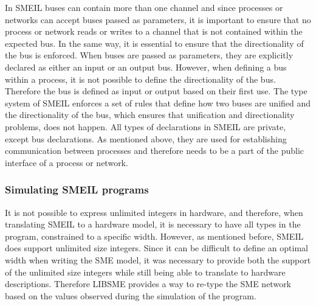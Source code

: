 In SMEIL buses can contain more than one channel and since processes or networks can accept buses passed as parameters, it is important to ensure that no process or network reads or writes to a channel that is not contained within the expected bus.
In the same way, it is essential to ensure that the directionality of the bus is enforced. When buses are passed as parameters, they are explicitly declared as either an input or an output bus. However, when defining a bus within a process, it is not possible to define the directionality of the bus. Therefore the bus is defined as input or output based on their first use.
The type system of SMEIL enforces a set of rules that define how two buses are unified and the directionality of the bus, which ensures that unification and directionality problems, does not happen.
All types of declarations in SMEIL are private, except bus declarations. As mentioned above, they are used for establishing communication between processes and therefore needs to be a part of the public interface of a process or network.

\subsubsection{Simulating SMEIL programs}
It is not possible to express unlimited integers in hardware, and therefore,
when translating SMEIL to a hardware model, it is necessary to have all types in the program, constrained to a specific width.
However, as mentioned before, SMEIL does support unlimited size integers. Since it can be difficult to define an optimal width when writing the SME model, it was necessary to provide both the support of the unlimited size integers while still being able to translate to hardware descriptions.
Therefore LIBSME provides a way to re-type the SME network based on the values observed during the simulation of the program.\\

